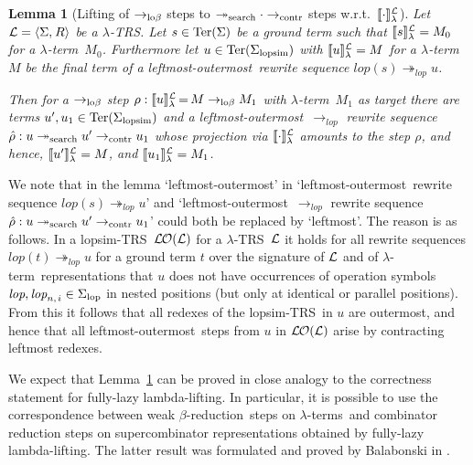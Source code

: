 \documentclass[
submission
]{dmtcs-episciences-tampered}
\newcommand{\funin}{\mathrel{:}}
\newcommand{\fap}[2]{#1({#2})}
\newcommand{\indap}[2]{#1 _{#2}}
\newcommand{\supap}[2]{#1 ^{#2}}
\newcommand{\pap}{\supap}
\newcommand{\nb}{\nobreakdash}
\newcommand{\nf}{\normalfont}
\newcommand{\tuple}[1]{\langle #1 \rangle}
\newcommand{\tuplespace}{\hspace*{0.5pt}}
\newcommand{\pair}[2]{\tuple{#1, \tuplespace #2}}
\newcommand{\ater}{s}
\newcommand{\bter}{t}
\newcommand{\cter}{u}
\newcommand{\cteracc}{\cter'}
\newcommand{\cteri}{\indap{\cter}}
\newcommand{\asig}{\Sigma}
\newcommand{\asiglop}{\indap{\asig}{\scriptlop}}
\newcommand{\asiglopsim}{\indap{\asig}{\scriptlopsim}}
\newcommand{\arules}{R}
\newcommand{\alTRS}{{\cal L}}
\newcommand{\TRS}{TRS}
\newcommand{\stermsover}{\text{\nf Ter}}
\newcommand{\termsover}{\fap{\stermsover}}
\newcommand{\slop}{\textit{lop}}\newcommand{\slopstar}{\pap{\slop}{*}}
\newcommand{\slopstart}{\slop}
\newcommand{\lopstart}{\fap{\slop}}
\newcommand{\slopni}[2]{\slop_{#1,\hspace*{1pt}#2}}
\newcommand{\denlterwrt}[2]{\llbracket{#2}\rrbracket^{#1}_{\sslabs}}
\newcommand{\lopsimTRS}{lopsim-TRS}
\newcommand{\alter}{M}
\newcommand{\alteri}{\indap{\alter}}
\newcommand{\sslabs}{\lambda}
\newcommand{\sred}{\to}
\newcommand{\sredi}{\indap{\sred}}
\newcommand{\smred}{\twoheadrightarrow}
\newcommand{\smredi}{\indap{\smred}}
\newcommand{\scriptlop}{\text{\nf lop}}
\newcommand{\scriptlopsim}{\text{\nf lopsim}}
\newcommand{\scriptsearch}{\text{\nf search}}
\newcommand{\scriptcontract}{\text{\nf contr}}
\newcommand{\ssearchmred}{\smredi{\scriptsearch}}
\newcommand{\searchmred}{\mathrel{\ssearchmred}}
\newcommand{\scontractred}{\sredi{\scriptcontract}}
\newcommand{\contractred}{\mathrel{\scontractred}}
\newcommand{\scriptlobeta}{\text{\nf lo}\beta}
\newcommand{\slobetared}{\sredi{\scriptlobeta}}
\newcommand{\lobetared}{\mathrel{\slobetared}}
\newcommand{\slopsimred}{\sredi{\slop}}
\newcommand{\slopsimmred}{\smredi{\slop}}
\newcommand{\lopsimmred}{\mathrel{\slopsimmred}}
\newcommand{\arewstep}{\rho}
\newcommand{\lambdaterm}{$\lambda$\nb-term}
\newcommand{\lambdaterms}{\lambdaterm{s}}
\newcommand{\lambdalifting}{lambda-lif\-ting}
\newcommand{\betareduction}{$\beta$\nb-re\-duc\-tion}
\newcommand{\lo}{left\-most-outer\-most}
\newcommand{\lTRS}{$\lambda$\hspace*{-0.5pt}\nb-\hspace*{-0.5pt}\TRS}
\theoremstyle{plain}
\newtheorem{lemma}[theorem]{Lemma}
\theoremstyle{definition}
\begin{document}
\begin{lemma}[Lifting of $\slobetared$ steps to $\ssearchmred \cdot \scontractred$ steps w.r.t.\ $\denlterwrt{\alTRS}{\cdot}$]\label{lem:lifting}
  Let $\alTRS = \pair{\asig}{\arules}$ be a \lTRS.
  Let $\ater\in\termsover{\asig}$ be a ground term 
  such that $\denlterwrt{\alTRS}{\ater} = \alteri{0}$ for a \lambdaterm~$\alteri{0}$.
  Furthermore let $\cter\in\termsover{\asiglopsim}$ 
  with $\denlterwrt{\alTRS}{\cter} = \alter$ for a \lambdaterm~$\alter$
  be the final term of a \lo\ rewrite sequence $\lopstart{\ater} \lopsimmred \cter$.
  
  Then for a $\slobetared$ step $\arewstep \funin \denlterwrt{\alTRS}{\cter} \,{=}\, \alter \lobetared \alteri{1}$ 
  with \lambdaterm~$\alteri{1}$ as target
  there are terms $\cteracc,\cteri{1}\in\termsover{\asiglopsim}$ 
  and a \lo\ $\slopsimred$ rewrite sequence 
  $\Hat{\rho} \funin \cter \searchmred \cteracc \contractred \cteri{1}$
  whose projection via $\denlterwrt{\alTRS}{\cdot}$ amounts to the step $\arewstep$,
  and hence, $\denlterwrt{\alTRS}{\cteracc} = \alter$, and $\denlterwrt{\alTRS}{\cteri{1}} = \alteri{1}$.
\end{lemma}

We note that in the lemma `\lo' in `\lo\ rewrite sequence $\lopstart{\ater} \lopsimmred \cter$'
and `\lo\ $\slopsimred$ rewrite sequence $\Hat{\rho} \funin \cter \searchmred \cteracc \contractred \cteri{1}$'
could both be replaced by `leftmost'. The reason is as follows. 
In a \lopsimTRS~$\lopsimTRSwrt{\alTRS}$ for a \lTRS~$\alTRS$ 
it holds for all rewrite sequences $\lopstart{\bter} \lopsimmred \cter$ for a ground term $\bter$ over the signature of $\alTRS$
and of \lambdaterm\ representations that $\cter$ does not have occurrences of operation symbols $\slopstart,\slopni{n}{i}\in\asiglop$ in nested positions
(but only at identical or parallel positions). 
From this it follows that all redexes of the \lopsimTRS\ in $\cter$ are outermost,
and hence that all \lo\ steps from $\cter$ in $\lopsimTRSwrt{\alTRS}$ arise by contracting leftmost redexes. 

We expect that Lemma~\ref{lem:lifting} can be proved in close analogy to the correctness statement for fully-lazy \lambdalifting.
In particular, it is possible to use the correspondence between weak \betareduction\ steps on \lambdaterms\
and combinator reduction steps on supercombinator representations obtained by fully-lazy \lambdalifting. 
The latter result was formulated and proved by Balabonski in \cite{bala:2012}.
\end{document}
